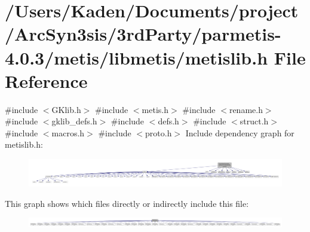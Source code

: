 \hypertarget{a00239}{}\section{/\+Users/\+Kaden/\+Documents/project/\+Arc\+Syn3sis/3rd\+Party/parmetis-\/4.0.3/metis/libmetis/metislib.h File Reference}
\label{a00239}
{\ttfamily \#include $<$G\+Klib.\+h$>$}\newline
{\ttfamily \#include $<$metis.\+h$>$}\newline
{\ttfamily \#include $<$rename.\+h$>$}\newline
{\ttfamily \#include $<$gklib\+\_\+defs.\+h$>$}\newline
{\ttfamily \#include $<$defs.\+h$>$}\newline
{\ttfamily \#include $<$struct.\+h$>$}\newline
{\ttfamily \#include $<$macros.\+h$>$}\newline
{\ttfamily \#include $<$proto.\+h$>$}\newline
Include dependency graph for metislib.\+h\+:\nopagebreak
\begin{figure}[H]
\begin{center}
\leavevmode
\includegraphics[width=350pt]{a00240}
\end{center}
\end{figure}
This graph shows which files directly or indirectly include this file\+:\nopagebreak
\begin{figure}[H]
\begin{center}
\leavevmode
\includegraphics[width=350pt]{a00241}
\end{center}
\end{figure}
